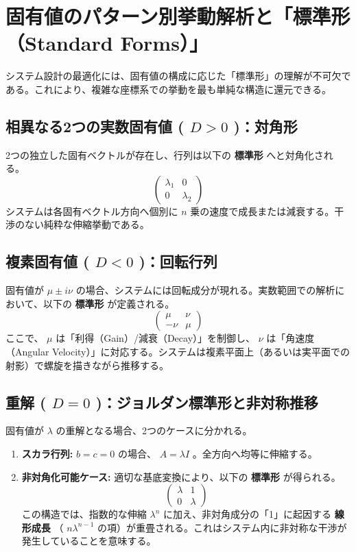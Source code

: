 ﻿\documentclass[12pt]{bxjsarticle}
\begin{document}
\section{固有値のパターン別挙動解析と「標準形（Standard Forms）」}

システム設計の最適化には、固有値の構成に応じた「標準形」の理解が不可欠である。これにより、複雑な座標系での挙動を最も単純な構造に還元できる。

\subsection{相異なる2つの実数固有値 ( $D > 0$ )：対角形}

2つの独立した固有ベクトルが存在し、行列は以下の \textbf{標準形} へと対角化される。  $$\begin{pmatrix} \lambda_1 & 0 \\ 0 & \lambda_2 \end{pmatrix}$$  システムは各固有ベクトル方向へ個別に  $n$  乗の速度で成長または減衰する。干渉のない純粋な伸縮挙動である。

\subsection{複素固有値 ( $D < 0$ )：回転行列}

固有値が  $\mu \pm i\nu$  の場合、システムには回転成分が現れる。実数範囲での解析において、以下の \textbf{標準形} が定義される。  $$\begin{pmatrix} \mu & \nu \\ -\nu & \mu \end{pmatrix}$$  ここで、 $\mu$  は「利得（Gain）/減衰（Decay）」を制御し、 $\nu$  は「角速度（Angular Velocity）」に対応する。システムは複素平面上（あるいは実平面での射影）で螺旋を描きながら推移する。

\subsection{重解 ( $D = 0$ )：ジョルダン標準形と非対称推移}

固有値が  $\lambda$  の重解となる場合、2つのケースに分かれる。

\begin{enumerate}
\item \textbf{スカラ行列:}   $b=c=0$  の場合、 $A = \lambda I$ 。全方向へ均等に伸縮する。
\item \textbf{非対角化可能ケース:}  適切な基底変換により、以下の \textbf{標準形} が得られる。  $$\begin{pmatrix} \lambda & 1 \\ 0 & \lambda \end{pmatrix}$$  この構造では、指数的な伸縮  $\lambda^n$  に加え、非対角成分の「1」に起因する \textbf{線形成長} （ $n \lambda^{n-1}$  の項）が重畳される。これはシステム内に非対称な干渉が発生していることを意味する。
\end{enumerate}
\end{document}
